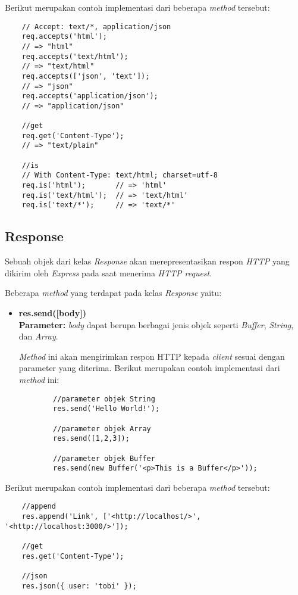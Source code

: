 Berikut merupakan contoh implementasi dari beberapa \textit{method} tersebut:

\begin{lstlisting}
	// Accept: text/*, application/json
	req.accepts('html');
	// => "html"
	req.accepts('text/html');
	// => "text/html"
	req.accepts(['json', 'text']);
	// => "json"
	req.accepts('application/json');
	// => "application/json"
	
	//get
	req.get('Content-Type');
	// => "text/plain"
	
	//is
	// With Content-Type: text/html; charset=utf-8
	req.is('html');       // => 'html'
	req.is('text/html');  // => 'text/html'
	req.is('text/*');     // => 'text/*'
\end{lstlisting}

\subsection{Response}
Sebuah objek dari kelas \textit{Response} akan merepresentasikan respon \textit{HTTP} yang dikirim oleh \textit{Express} pada saat menerima \textit{HTTP request}.

Beberapa \textit{method} yang terdapat pada kelas \textit{Response} yaitu: 

\begin{itemize}
	\item \textbf{res.send([body])} \\ \textbf{Parameter:} \textit{body} dapat berupa berbagai jenis objek seperti \textit{Buffer}, \textit{String}, dan \textit{Array}.
	
	\textit{Method} ini akan mengirimkan respon HTTP kepada \textit{client} sesuai dengan parameter yang diterima. Berikut merupakan contoh implementasi dari \textit{method} ini:
	\begin{lstlisting}
		//parameter objek String
		res.send('Hello World!');
		
		//parameter objek Array
		res.send([1,2,3]);
		
		//parameter objek Buffer
		res.send(new Buffer('<p>This is a Buffer</p>'));
	\end{lstlisting}
	
	
	
	
\end{itemize}

Berikut merupakan contoh implementasi dari beberapa \textit{method} tersebut:

\begin{lstlisting}
	//append
	res.append('Link', ['<http://localhost/>', '<http://localhost:3000/>']);
	
	//get
	res.get('Content-Type');
	
	//json
	res.json({ user: 'tobi' });
	
	
\end{lstlisting}

